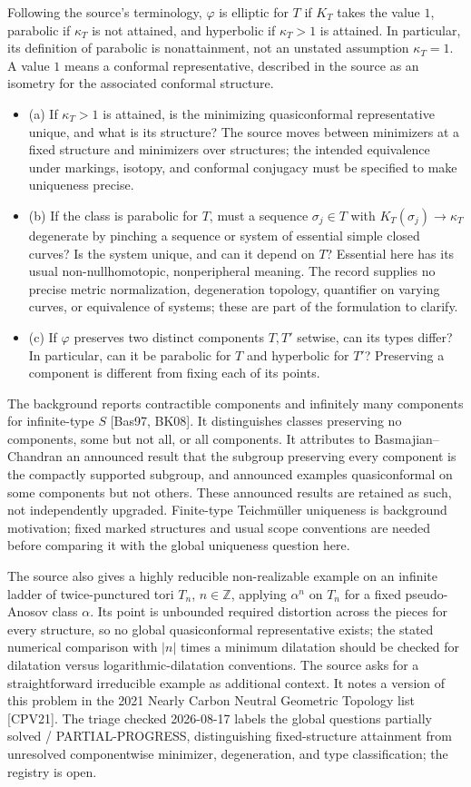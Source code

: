 \documentclass[11pt]{article}
\newcommand{\Z}{\mathbb{Z}}
\begin{document}
Following the source's terminology, $\varphi$ is elliptic for $T$ if $K_T$ takes the value $1$, parabolic if $\kappa_T$ is not attained, and hyperbolic if $\kappa_T>1$ is attained. In particular, its definition of parabolic is nonattainment, not an unstated assumption $\kappa_T=1$. A value $1$ means a conformal representative, described in the source as an isometry for the associated conformal structure.
\begin{itemize}
\item (a) If $\kappa_T>1$ is attained, is the minimizing quasiconformal representative unique, and what is its structure? The source moves between minimizers at a fixed structure and minimizers over structures; the intended equivalence under markings, isotopy, and conformal conjugacy must be specified to make uniqueness precise.
\item (b) If the class is parabolic for $T$, must a sequence $\sigma_j\in T$ with $K_T(\sigma_j)\to\kappa_T$ degenerate by pinching a sequence or system of essential simple closed curves? Is the system unique, and can it depend on $T$? Essential here has its usual non-nullhomotopic, nonperipheral meaning. The record supplies no precise metric normalization, degeneration topology, quantifier on varying curves, or equivalence of systems; these are part of the formulation to clarify.
\item (c) If $\varphi$ preserves two distinct components $T,T'$ setwise, can its types differ? In particular, can it be parabolic for $T$ and hyperbolic for $T'$? Preserving a component is different from fixing each of its points.
\end{itemize}
The background reports contractible components and infinitely many components for infinite-type $S$ [Bas97, BK08]. It distinguishes classes preserving no components, some but not all, or all components. It attributes to Basmajian--Chandran an announced result that the subgroup preserving every component is the compactly supported subgroup, and announced examples quasiconformal on some components but not others. These announced results are retained as such, not independently upgraded. Finite-type Teichm\"uller uniqueness is background motivation; fixed marked structures and usual scope conventions are needed before comparing it with the global uniqueness question here.

The source also gives a highly reducible non-realizable example on an infinite ladder of twice-punctured tori $T_n$, $n\in\Z$, applying $\alpha^n$ on $T_n$ for a fixed pseudo-Anosov class $\alpha$. Its point is unbounded required distortion across the pieces for every structure, so no global quasiconformal representative exists; the stated numerical comparison with $|n|$ times a minimum dilatation should be checked for dilatation versus logarithmic-dilatation conventions. The source asks for a straightforward irreducible example as additional context. It notes a version of this problem in the 2021 Nearly Carbon Neutral Geometric Topology list [CPV21]. The triage checked 2026-08-17 labels the global questions partially solved / PARTIAL-PROGRESS, distinguishing fixed-structure attainment from unresolved componentwise minimizer, degeneration, and type classification; the registry is open.
\end{document}
